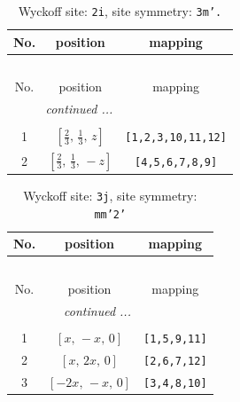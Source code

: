 \documentclass[fleqn,8pt]{jsarticle}
\begin{document}
\renewcommand{\arraystretch}{1.2}
\begin{longtable}{ccc}
\caption{Wyckoff site: {\tt 2i}, site symmetry: {\tt 3m'.}}
 \\
 \hline \hline
No. & position & mapping \\ \hline \endfirsthead

\multicolumn{2}{l}{\tablename\ \thetable{}} \\
 \hline \hline
No. & position & mapping \\ \hline \endhead

 \hline \hline
\multicolumn{2}{r}{\footnotesize\it continued ...} \\ \endfoot

 \hline \hline
\multicolumn{2}{r}{} \\ \endlastfoot

1 & $\left[ \frac{2}{3},\, \frac{1}{3},\, z \right]$ & {\tt [1,2,3,10,11,12]} \\ \hline
2 & $\left[ \frac{2}{3},\, \frac{1}{3},\, - z \right]$ & {\tt [4,5,6,7,8,9]} \\
\end{longtable}
\renewcommand{\arraystretch}{1.2}
\begin{longtable}{ccc}
\caption{Wyckoff site: {\tt 3j}, site symmetry: {\tt mm'2'}}
 \\
 \hline \hline
No. & position & mapping \\ \hline \endfirsthead

\multicolumn{2}{l}{\tablename\ \thetable{}} \\
 \hline \hline
No. & position & mapping \\ \hline \endhead

 \hline \hline
\multicolumn{2}{r}{\footnotesize\it continued ...} \\ \endfoot

 \hline \hline
\multicolumn{2}{r}{} \\ \endlastfoot

1 & $\left[ x,\, - x,\, 0 \right]$ & {\tt [1,5,9,11]} \\ \hline
2 & $\left[ x,\, 2 x,\, 0 \right]$ & {\tt [2,6,7,12]} \\ \hline
3 & $\left[ - 2 x,\, - x,\, 0 \right]$ & {\tt [3,4,8,10]} \\
\end{longtable}
\renewcommand{\arraystretch}{1.2}
\end{document}
